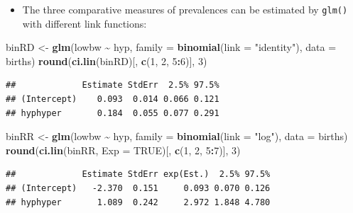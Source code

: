 \documentclass[
]{book}
\newenvironment{Shaded}{\begin{snugshade}}{\end{snugshade}}
\newcommand{\AttributeTok}[1]{\textcolor[rgb]{0.13,0.29,0.53}{#1}}
\newcommand{\ConstantTok}[1]{\textcolor[rgb]{0.56,0.35,0.01}{#1}}
\newcommand{\DecValTok}[1]{\textcolor[rgb]{0.00,0.00,0.81}{#1}}
\newcommand{\FunctionTok}[1]{\textcolor[rgb]{0.13,0.29,0.53}{\textbf{#1}}}
\newcommand{\NormalTok}[1]{#1}
\newcommand{\OtherTok}[1]{\textcolor[rgb]{0.56,0.35,0.01}{#1}}
\newcommand{\SpecialCharTok}[1]{\textcolor[rgb]{0.81,0.36,0.00}{\textbf{#1}}}
\newcommand{\StringTok}[1]{\textcolor[rgb]{0.31,0.60,0.02}{#1}}
\providecommand{\tightlist}{%
  \setlength{\itemsep}{0pt}\setlength{\parskip}{0pt}}
\begin{document}
\begin{itemize}
\tightlist
\item
  The three comparative measures of prevalences can be
  estimated by \texttt{glm()} with different link functions:
\end{itemize}

\begin{Shaded}
\begin{Highlighting}[]
\NormalTok{binRD }\OtherTok{\textless{}{-}} \FunctionTok{glm}\NormalTok{(lowbw }\SpecialCharTok{\textasciitilde{}}\NormalTok{ hyp, }\AttributeTok{family =} \FunctionTok{binomial}\NormalTok{(}\AttributeTok{link =} \StringTok{"identity"}\NormalTok{), }\AttributeTok{data =}\NormalTok{ births)}
\FunctionTok{round}\NormalTok{(}\FunctionTok{ci.lin}\NormalTok{(binRD)[, }\FunctionTok{c}\NormalTok{(}\DecValTok{1}\NormalTok{, }\DecValTok{2}\NormalTok{, }\DecValTok{5}\SpecialCharTok{:}\DecValTok{6}\NormalTok{)], }\DecValTok{3}\NormalTok{)}
\end{Highlighting}
\end{Shaded}

\begin{verbatim}
##             Estimate StdErr  2.5% 97.5%
## (Intercept)    0.093  0.014 0.066 0.121
## hyphyper       0.184  0.055 0.077 0.291
\end{verbatim}

\begin{Shaded}
\begin{Highlighting}[]
\NormalTok{binRR }\OtherTok{\textless{}{-}} \FunctionTok{glm}\NormalTok{(lowbw }\SpecialCharTok{\textasciitilde{}}\NormalTok{ hyp, }\AttributeTok{family =} \FunctionTok{binomial}\NormalTok{(}\AttributeTok{link =} \StringTok{"log"}\NormalTok{), }\AttributeTok{data =}\NormalTok{ births)}
\FunctionTok{round}\NormalTok{(}\FunctionTok{ci.lin}\NormalTok{(binRR, }\AttributeTok{Exp =} \ConstantTok{TRUE}\NormalTok{)[, }\FunctionTok{c}\NormalTok{(}\DecValTok{1}\NormalTok{, }\DecValTok{2}\NormalTok{, }\DecValTok{5}\SpecialCharTok{:}\DecValTok{7}\NormalTok{)], }\DecValTok{3}\NormalTok{)}
\end{Highlighting}
\end{Shaded}

\begin{verbatim}
##             Estimate StdErr exp(Est.)  2.5% 97.5%
## (Intercept)   -2.370  0.151     0.093 0.070 0.126
## hyphyper       1.089  0.242     2.972 1.848 4.780
\end{verbatim}
\end{document}
